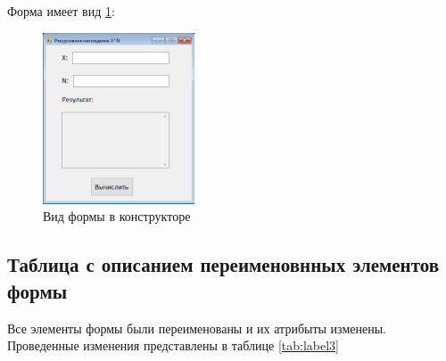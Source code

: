 Форма имеет вид \ref{fig:FormInConstruct3}:

\begin{figure}[!h]
    \centering
    \includegraphics[width = 0.4\textwidth]{images/Task3/FormInConstructor.png}
    \caption{Вид формы в конструкторе}
    \label{fig:FormInConstruct3}
\end{figure}

\newpage

\subsection{Таблица с описанием переименовнных элементов формы}

Все элементы формы были переименованы и их атрибыты изменены. Проведенные изменения представлены в таблице \ref{tab:label3}

